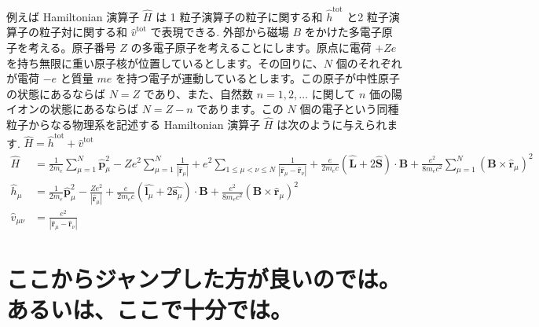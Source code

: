 \documentclass[uplatex,dvipdfmx,a4paper,11pt]{jlreq}
\newcommand{\rr}{\bm{r}}
\newcommand{\pp}{\bm{p}}
\numberwithin{equation}{section}
\theoremstyle{definition}
\begin{document}
\begin{example}
  例えば Hamiltonian 演算子 $\hat{H}$ は 1 粒子演算子の粒子に関する和 $\hat{h}^{\mathrm{tot}}$ と2 粒子演算子の粒子対に関する和 $\hat{v}^{\mathrm{tot}}$ で表現できる.
  外部から磁場 $B$ をかけた多電子原子を考える。原子番号 $Z$ の多電子原子を考えることにします。原点に電荷 $+Ze$ を持ち無限に重い原子核が位置しているとします。その回りに、$N$ 個のそれぞれが電荷 $-e$ と質量 $me$ を持つ電子が運動しているとします。この原子が中性原子の状態にあるならば $N = Z$ であり、また、自然数 $n = 1, 2,\ldots$ に関して $n$ 価の陽イオンの状態にあるならば $N = Z - n$ であります。この $N$ 個の電子という同種粒子からなる物理系を記述する Hamiltonian 演算子 $\hat{H}$ は次のように与えられます.
  $\hat{H} = \hat{h}^{\mathrm{tot}} + \hat{v}^{\mathrm{tot}}$
  \begin{align}
    \hat{H}          & = \frac{1}{2m_e}\sum_{\mu=1}^{N}\hat{\pp}_\mu^2 - Ze^2\sum_{\mu=1}^{N}\frac{1}{|\hat{\rr}_\mu|} + e^2\sum_{1\leq\mu<\nu\leq N}\frac{1}{|\hat{\rr}_\mu - \hat{\rr}_\nu|} + \frac{e}{2m_ec}(\hat{\bm{L}} + 2\hat{\bm{S}})\cdot\bm{B} + \frac{e^2}{8m_ec^2}\sum_{\mu=1}^{N}(\bm{B}\times\hat{\rr}_\mu)^2 \\
    \hat{h}_\mu      & = \frac{1}{2m_e}\hat{\pp}_\mu^2 - \frac{Ze^2}{|\hat{\rr}_\mu|} + \frac{e}{2m_ec}(\hat{\bm{l}_\mu} + 2\hat{\bm{s}_\mu})\cdot\bm{B} + \frac{e^2}{8m_ec^2}(\bm{B}\times\hat{\rr}_\mu)^2                                                                                                                  \\
    \hat{v}_{\mu\nu} & = \frac{e^2}{|\hat{\rr}_\mu - \hat{\rr}_\nu|}
  \end{align}
\end{example}

\section{ここからジャンプした方が良いのでは。あるいは、ここで十分では。}
\end{document}

